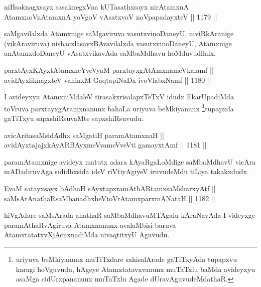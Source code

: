 \begin{shl}
niHsaknagxsayx sasaknegxVna kUTasathxsayx nirAtamxnA || \\
AtamxnoV\s nAtamxnA yoVgoV vAsatxvoV noVpapadayxteV \hfill || 1179 ||  
\end{shl}

\begin{artha}
saMgavilalxda Atamxnige saMgaviruva vasutxvinoDaneyU, niviRkAranige (vikAraviruva) nishacxlasavxBAvavilalxda vasutxvinoDaneyU, Atamxnige anAtamxdoDaneyU vAsatxvikavAda saMbaMdhavu hoMduvudilalx.
\end{artha}


\begin{shl}
parxtAyxKAyxtA\s \s tamxneYveVyaM parxtayxgAtAmxnameVkalamf || \\
avidAyx\s \s liknagxteV vahinxM GaqtapiNaDx ivoVlabxNamf \hfill || 1180 ||  
\end{shl}

\begin{artha}
I avideyxyu AtamxniMdaleV tirasakxrisalapxTeTxV idudx EkarUpadiMda toVruva parxtayxgAtamxnanunx bahaLa uriyuva beMkiyanunx \footnote{uriyuva beMkiyanunx muTiTxdare sahisalArade gaTiTxyAda tupapxvu karagi hoVguvudu, hAgeye Atamxtatavxvanunx muTaTxlu baMda avideyxyu asaMga cidUrxpananunx muTaTxlu Agade dUravAguvudeMdathaR.}tupapxda gaTiTxyu sapxshiRsuvaMte sapxshiRsuvudu.
\end{artha}

\begin{shl}
avicAritasaMsidAdhx saMgatiH paramAtamxnaH || \\
avidAyxtajajxkAyARBAyxmeVvameVveVti gamayxtAmf \hfill || 1181 ||  
\end{shl}

\begin{artha}
paramAtamxnige avideyx matutx adara kAyaRgaLoMdige saMbaMdhavU vicAra mADadiruvAga sididhxsida ideV riVtiyAgiyeV iruvudeMdu tiLiya takakxdudx.
\end{artha}

\begin{shl}
EvaM satayxsayx bAdhaH sAyxtapxramAthARtamxsaMsharxyAtf || \\
saMsArAnathaRsaMbanadhxheVtoVrAtamxparxmANataH \hfill || 1182 ||  
\end{shl}

\begin{artha}
hiVgAdare saMsArada anathaR saMbaMdhavuMTAgalu kAraNavAda I videyxge paramAthaRvAgiruva Atamxnanunx avalaMbisi baruva AtamxtatatxvXjAcnxnadiMda nivaqtitxyU Aguvudu.
\end{artha}

